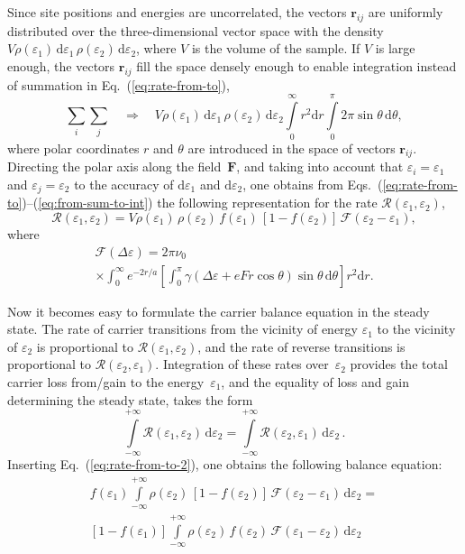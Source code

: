 \documentclass[aps,reprint,amsmath,amssymb,superscriptaddress,showpacs,prb]{revtex4-1}
\newcommand{\ve}{\varepsilon}
\renewcommand{\alpha}{ a }
\begin{document}
Since site positions and energies are uncorrelated, the vectors $\mathbf{r}_{ij}$ are uniformly distributed over the three-dimensional vector space with the density $V \rho(\ve_1) \, \mathrm{d}\ve_1 \, \rho(\ve_2) \, \mathrm{d}\ve_2$, where $V$ is the volume of the sample. If $V$ is large enough, the vectors $\mathbf{r}_{ij}$ fill the space densely enough to enable integration instead of summation in Eq.~(\ref{eq:rate-from-to}),
\begin{equation}
	\label{eq:from-sum-to-int}
	\sum_i \sum_j \quad \Rightarrow \quad
	V \rho(\ve_1) \, \mathrm{d}\ve_1 \, \rho(\ve_2) \, \mathrm{d}\ve_2
	\int\limits_0^\infty r^2 \mathrm{d}r \int\limits_0^\pi 2\pi\sin\theta \, \mathrm{d}\theta ,
\end{equation}
where polar coordinates $r$ and $\theta$ are introduced in the space of vectors $\mathbf{r}_{ij}$. Directing the polar axis along the field~$\mathbf{F}$, and taking into account that $\ve_i=\ve_1$ and $\ve_j=\ve_2$ to the accuracy of $\mathrm{d}\ve_1$ and $\mathrm{d}\ve_2$, one obtains from Eqs.~(\ref{eq:rate-from-to})--(\ref{eq:from-sum-to-int}) the following representation for the rate $\mathcal{R}(\ve_1,\ve_2)$,
\begin{equation}
	\label{eq:rate-from-to-2}
	\mathcal{R}(\ve_1,\ve_2) = V \rho(\ve_1) \, \rho(\ve_2) \, f(\ve_1) \, [1-f(\ve_2)] \, \mathcal{F}(\ve_2-\ve_1) ,
\end{equation}
where
\begin{multline}
	\label{eq:F-function}
	\mathcal{F}(\Delta\ve) = 2\pi\nu_0  \\
	\times \int_0^\infty e^{-2r/\alpha} \left[ \int_0^\pi \gamma(\Delta\ve+eFr\cos\theta) \sin\theta \, \mathrm{d}\theta \right] r^2 \mathrm{d}r .
\end{multline}

Now it becomes easy to formulate the carrier balance equation in the steady state. The rate of carrier transitions from the vicinity of energy $\ve_1$ to the vicinity of $\ve_2$ is proportional to $\mathcal{R}(\ve_1,\ve_2)$, and the rate of reverse transitions is proportional to $\mathcal{R}(\ve_2,\ve_1)$. Integration of these rates over~$\ve_2$ provides the total carrier loss from/gain to the energy~$\ve_1$, and the equality of loss and gain determining the steady state,  takes the form
\begin{equation}
	\label{eq:balance-R}
	\int\limits_{-\infty}^{+\infty} \mathcal{R}(\ve_1,\ve_2) \, \mathrm{d}\ve_2 = \int\limits_{-\infty}^{+\infty} \mathcal{R}(\ve_2,\ve_1) \, \mathrm{d}\ve_2 \, .
\end{equation}
Inserting Eq.~(\ref{eq:rate-from-to-2}), one obtains the following balance equation:
\begin{multline}
	\label{eq:balance}
	f(\ve_1) \int\limits_{-\infty}^{+\infty} \rho(\ve_2) \, [1-f(\ve_2)] \, \mathcal{F}(\ve_2-\ve_1) \, \mathrm{d}\ve_2 =  \\
	[1-f(\ve_1)] \int\limits_{-\infty}^{+\infty} \rho(\ve_2) \, f(\ve_2) \, \mathcal{F}(\ve_1-\ve_2) \, \mathrm{d}\ve_2
\end{multline}
\end{document}
